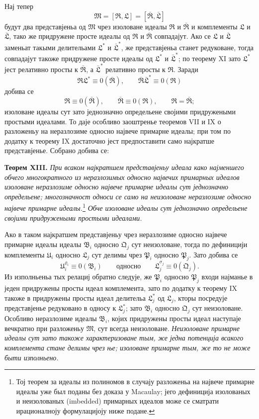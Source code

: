 ﻿\documentclass[11pt]{article}
\newcommand{\ideal}[1]{\mathfrak{#1}}
\begin{document}
Нај тепер
\[
 \ideal M=[\ideal R,\ideal L]=[\bar{\ideal R},\bar{\ideal L}]
\]
будут два представјеньа од \(\ideal M\) чрез изоловане идеалы \(\ideal R\) и \(\bar{\ideal R}\) и комплементы \(\ideal L\) и \(\bar{\ideal L}\), тако же придружене просте идеалы од \(\ideal R\) и \(\bar{\ideal R}\) совпадајут. Ако се \(\ideal L\) и \(\bar{\ideal L}\) заменьат такыми делительами \(\ideal L^*\) и \(\bar{\ideal L}^{*}\), же представјеньа станет редуковане, тогда совпадајут такоже придружене просте идеалы од \(\ideal L^*\) и \(\bar{\ideal L}^{*}\); по теорему XI зато \(\ideal L^*\) јест релативно просты к \(\bar{\ideal R}\), а \(\bar{\ideal L}^{*}\) релативно просты к \(\ideal R\). Заради
\[
 \ideal R\ideal L^*\equiv0(\bar{\ideal R}),
 \qquad
 \bar{\ideal R}\bar{\ideal L}^{*}\equiv0(\ideal R)
\]
добива се
\[
 \ideal R\equiv0(\bar{\ideal R}),
 \qquad
 \bar{\ideal R}\equiv0(\ideal R),
 \qquad
 \ideal R=\bar{\ideal R};
\]
изоловане идеалы сут зато једнозначно определьене својими придружеными простыми идеалами. То даје особливо заоштренье теоремов VII и IX о разложеньу на неразлозиме односно највече примарне идеалы; при том по додатку к теорему IX достаточно јест предпоставити само најкратше представјенье. Собрано добива се:

\textbf{Теорем XIII.} \emph{При всаком најкратшем представјеньу идеала како најменшего обчего многократного из неразлозимых односно највечих примарных идеалов изоловане неразлозиме односно највече примарне идеалы сут једнозначно определьене; многозначност односи се само на неизоловане неразлозиме односно највече примарне идеалы.}\footnote{Тој теорем за идеалы из полиномов в случају разложеньа на највече примарне идеалы уже был поданы без доказа у Macaulay; јего дефиниција изолованых и неизолованых (imbedded) примарных идеалов може се сматрати ирационалноју формулацијоју ниже подане.} \emph{Обче изоловане идеалы сут једнозначно определьене својими придружеными простыми идеалами.}

Ако в таком најкратшем представјеньу чрез неразлозиме односно највече примарне идеалы идеалы \(\ideal B_i\) односно \(\ideal Q_j\) сут неизоловане, тогда по дефиницији комплементы \(\ideal U_i\) односно \(\ideal L_j\) сут делимы чрез \(\ideal P_i\) односно \(\ideal P_j\). Зато добива се
\[
 \ideal U_i^{\varrho_i}\equiv0(\ideal B_i)
 \qquad \text{односно} \qquad
 \ideal L_j^{\sigma_j}\equiv0(\ideal Q_j).
\]
Из изполньеньа тых релациј обратно следује, же \(\ideal P_i\) односно \(\ideal P_j\) входи најманье в једен придружены просты идеал комплемента, зато по додатку к теорему IX такоже в придружены просты идеал делительа \(\ideal L_j^*\) од \(\ideal L_j\), кторы посредује представјенье редуковано в односу к \(\ideal L_j^*\); зато \(\ideal B_i\) односно \(\ideal Q_j\) сут неизоловане. Особливо неразлозиме идеалы \(\ideal B_i\), којих придружены просты идеал наступаје вечкратно при разложеньу \(\ideal M\), сут всегда неизоловане. \emph{Неизоловане примарне идеалы сут зато такоже характеризоване тым, же једна потенција всакого комплемента стане делимы чрез ње; изоловане примарне тым, же то не може быти изполньено.}
\end{document}
